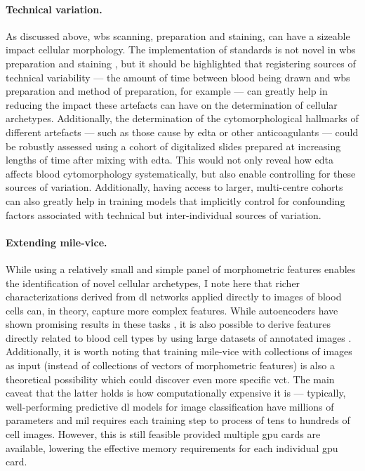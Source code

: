 \paragraph{Technical variation.} As discussed above, \ac{wbs} scanning, preparation and staining, can have a sizeable impact cellular morphology. The implementation of standards is not novel in \ac{wbs} preparation and staining \cite{Vives_Corrons2004-ha}, but it should be highlighted that registering sources of technical variability --- the amount of time between blood being drawn and \ac{wbs} preparation and method of preparation, for example --- can greatly help in reducing the impact these artefacts can have on the determination of cellular archetypes. Additionally, the determination of the cytomorphological hallmarks of different artefacts --- such as those cause by \ac{edta} or other anticoagulants --- could be robustly assessed using a cohort of digitalized slides prepared at increasing lengths of time after mixing with \ac{edta}. This would not only reveal how \ac{edta} affects blood cytomorphology systematically, but also enable controlling for these sources of variation. Additionally, having access to larger, multi-centre cohorts can also greatly help in training models that implicitly control for confounding factors associated with technical but inter-individual sources of variation.

\paragraph{Extending \ac{mile-vice}.} While using a relatively small and simple panel of morphometric features enables the identification of novel cellular archetypes, I note here that richer characterizations derived from \ac{dl} networks applied directly to images of blood cells can, in theory, capture more complex features. While autoencoders have shown promising results in these tasks \cite{Sommer2017-uj,Wei2021-gw}, it is also possible to derive features directly related to blood cell types by using large datasets of annotated images \cite{Matek2021-mp}. Additionally, it is worth noting that training \ac{mile-vice} with collections of images as input (instead of collections of vectors of morphometric features) is also a theoretical possibility which could discover even more specific \ac{vct}. The main caveat that the latter holds is how computationally expensive it is --- typically, well-performing predictive \ac{dl} models for image classification have millions of parameters and \ac{mil} requires each training step to process of tens to hundreds of cell images. However, this is still feasible provided multiple \ac{gpu} cards are available, lowering the effective memory requirements for each individual \ac{gpu} card.

